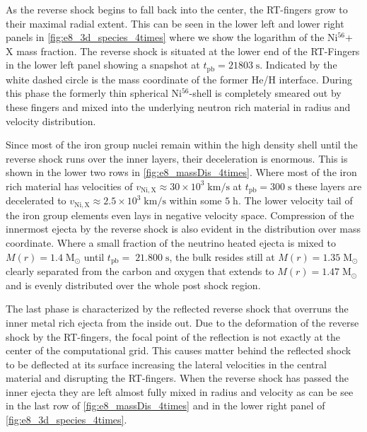 \documentclass[fleqn,usenatbib]{mnras}
\newcommand{\nickel}{$\mathrm{Ni^{56}}$\xspace}
\newcommand{\tracer}{$\mathrm{X}$\xspace}
\begin{document}
As the reverse shock begins to fall back into the center, the RT-fingers grow to their maximal radial extent. This can be seen in the lower left and lower right panels in \autoref{fig:e8_3d_species_4times} where we show the logarithm of the \nickel + \tracer mass fraction. The reverse shock is situated at the lower end of the RT-Fingers in the lower left panel showing a snapshot at $t_{\mathrm{pb}}=21803\;\mathrm{s}$. Indicated by the white dashed circle is the mass coordinate of the former He/H interface.
During this phase the formerly thin spherical \nickel-shell is completely smeared out by these fingers and mixed into the underlying neutron rich material in radius and velocity distribution. 

Since most of the iron group nuclei remain within the high density shell until the reverse shock runs over the inner layers, their deceleration is enormous. This is shown in the lower two rows in \autoref{fig:e8_massDis_4times}. Where most of the iron rich material has velocities of $v_{\mathrm{Ni,X}}\approx 30\times10^3 \;\mathrm{km/s}$ at $t_{\mathrm{pb}}=300\;\mathrm{s}$ these layers are decelerated to $v_{\mathrm{Ni,X}}\approx 2.5\times 10^3\;\mathrm{km/s}$ within some $5 \;\mathrm{h}$. The lower velocity tail of the iron group elements even lays in negative velocity space. 
Compression of the innermost ejecta by the reverse shock is also evident in the distribution over mass coordinate. Where a small fraction of the neutrino heated ejecta is mixed to $M(r)=1.4\;\mathrm{M_{\odot}}$ until $t_{\mathrm{pb}}=\;21.800\;\mathrm{s}$, the bulk resides still at  $M(r)=1.35\;\mathrm{M_{\odot}}$ clearly separated from the carbon and oxygen that extends to $M(r)=1.47\;\mathrm{M_{\odot}}$ and is evenly distributed over the whole post shock region.

The last phase is characterized by the reflected reverse shock that overruns the inner metal rich ejecta from the inside out. Due to the deformation of the reverse shock by the RT-fingers, the focal point of the reflection is not exactly at the center of the computational grid. This causes matter behind the reflected shock to be deflected at its surface  increasing the lateral velocities in the central material and disrupting the RT-fingers. When the reverse shock has passed the inner ejecta they are left almost fully mixed in radius and velocity as can be see in the last row of \autoref{fig:e8_massDis_4times} and in the lower right panel of \autoref{fig:e8_3d_species_4times}.
\end{document}
